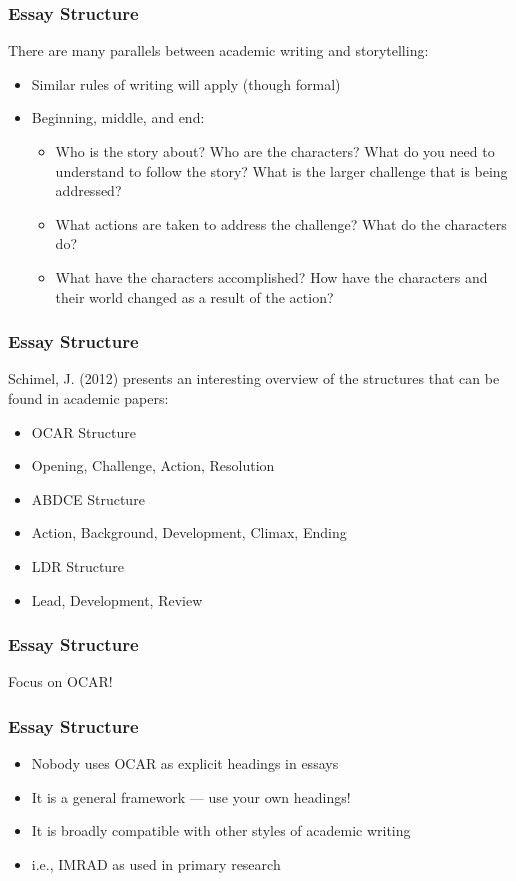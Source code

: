 \begin{frame}
	\frametitle{Essay Structure}
	
	There are many parallels between academic writing and storytelling:
	
	\begin{itemize}
		\item Similar rules of writing will apply (though formal)
		\item Beginning, middle, and end:
		\begin{itemize}
			\item Who is the story about? Who are the characters? What do you need to understand to follow the story? What is the larger challenge that is being addressed?
			\item What actions are taken to address the challenge? What do the characters do?
			\item What have the characters accomplished? How have the characters and their world changed as a result of the action?
		\end{itemize}
	\end{itemize}
\end{frame}

\begin{frame}
	\frametitle{Essay Structure}
	
	Schimel, J. (2012) presents an interesting overview of the structures that can be found in academic papers:
	
	\begin{itemize}
		\item OCAR Structure
		\item Opening, Challenge, Action, Resolution

		\item ABDCE Structure
		\item Action, Background, Development, Climax, Ending
		
		\item LDR Structure
		\item Lead, Development, Review
	\end{itemize}
\end{frame}

\begin{frame}
	\frametitle{Essay Structure}
	
	Focus on OCAR!

\end{frame}



\begin{frame}
	\frametitle{Essay Structure}
	
	\begin{itemize}
		\item Nobody uses OCAR as explicit headings in essays
		\item It is a general framework --- use your own headings!
		\item It is broadly compatible with other styles of academic writing
		\item i.e., IMRAD as used in primary research
	\end{itemize}
\end{frame}


